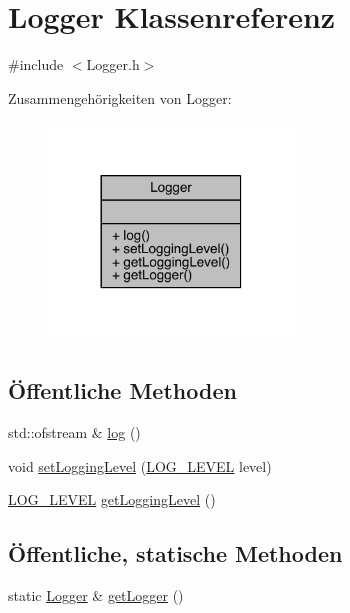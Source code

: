 \hypertarget{class_logger}{}\section{Logger Klassenreferenz}
\label{class_logger}


{\ttfamily \#include $<$Logger.\+h$>$}



Zusammengehörigkeiten von Logger\+:
\nopagebreak
\begin{figure}[H]
\begin{center}
\leavevmode
\includegraphics[width=185pt]{class_logger__coll__graph}
\end{center}
\end{figure}
\subsection*{Öffentliche Methoden}
\begin{DoxyCompactItemize}
\item 
std\+::ofstream \& \hyperlink{class_logger_af8a0b7a8939294ceb2cef39c358dfa9c}{log} ()
\item 
void \hyperlink{class_logger_a3759fa32a4f0c7255f61a2ce6484c194}{set\+Logging\+Level} (\hyperlink{_logger_8h_aa5a9053636a30269210c54e734e0d583}{L\+O\+G\+\_\+\+L\+E\+V\+EL} level)
\item 
\hyperlink{_logger_8h_aa5a9053636a30269210c54e734e0d583}{L\+O\+G\+\_\+\+L\+E\+V\+EL} \hyperlink{class_logger_acce532a939622d2b5c919f5f67236564}{get\+Logging\+Level} ()
\end{DoxyCompactItemize}
\subsection*{Öffentliche, statische Methoden}
\begin{DoxyCompactItemize}
\item 
static \hyperlink{class_logger}{Logger} \& \hyperlink{class_logger_afa2765f0a04e7a50e1efc38cce67a763}{get\+Logger} ()
\end{DoxyCompactItemize}


